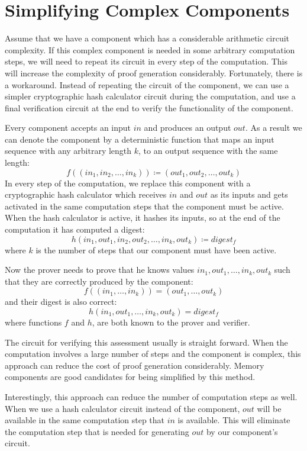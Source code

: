 \pagebreak


\section{Simplifying Complex Components}\label{sec:simplifying-complex-components}

Assume that we have a component which has a considerable arithmetic circuit complexity. If this complex component
is needed in some arbitrary computation steps, we will need to repeat its circuit in every step of the computation. This
will increase the complexity of proof generation considerably. Fortunately, there is a workaround. Instead of
repeating the circuit of the component, we can use a simpler cryptographic hash calculator circuit during the
computation, and use a final verification circuit at the end to verify the functionality of the component.

Every component accepts an input $in$ and produces an output $out$. As a result we can denote the component by a
deterministic function that maps an input sequence with any arbitrary length $k$, to an output sequence with the same
length:
\[
    f((in_1,in_2,\dots,in_k)) \coloneqq (out_1,out_2,\dots,out_k)
\]
In every step of the computation, we replace this component with a cryptographic hash calculator which receives $in$ and
$out$ as its inputs and gets activated in the same computation steps that the component must be active. When the
hash calculator is active, it hashes its inputs, so at the end of the computation it has computed a digest:
\[
    h(in_1,out_1,in_2,out_2,\dots,in_k,out_k) \coloneqq digest_f
\]
where $k$ is the number of steps that our component must have been active.

Now the prover needs to prove that he knows values $in_1,out_1,\dots,in_k,out_k$ such that they are correctly
produced by the component:
\[
    f((in_1,\dots,in_k)) = (out_1,\dots,out_k)
\]
and their digest is also correct:
\[
    h(in_1,out_1,\dots,in_k,out_k) = digest_f
\]
where functions $f$ and $h$, are both known to the prover and verifier.

The circuit for verifying this assessment usually is straight forward. When the computation involves a large
number of steps and the component is complex, this approach can reduce the cost of proof generation considerably. Memory
components are good candidates for being simplified by this method.

Interestingly, this approach can reduce the number of computation steps as well. When we use a hash calculator circuit
instead of the component, $out$ will be available in the same computation step that $in$ is available. This will
eliminate the computation step that is needed for generating $out$ by our component's circuit.
%
